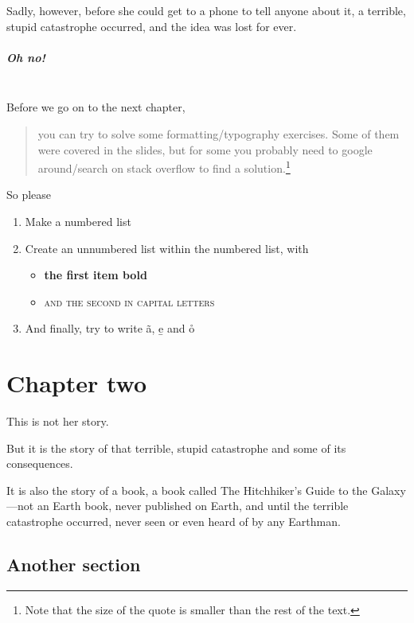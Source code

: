 \documentclass[a4paper, twocolumn, openany]{book}
\begin{document}
	Sadly, however, before she could get to a phone to tell anyone about it, a terrible, stupid catastrophe occurred, and the idea was lost for ever.
	
	\paragraph{Oh no!}~\\

\noindent Before we go on to the next chapter,
	
	\begin{quote}
		\small you can try to solve some formatting/typography exercises. Some of them were covered in the slides, but for some you probably need to google around/search on stack overflow to find a solution.\footnote{Note that the size of the quote is smaller than the rest of the text.}
	\end{quote}
	
\noindent So please
	
	\begin{enumerate}
		\item Make a numbered list
		\item Create an unnumbered list within the numbered list, with
		\begin{itemize}
			\item \textbf{the first item bold}
			\item \textsc{and the second in capital letters}
		\end{itemize}
		\item And finally, try to write \~{a}, \b{e} and \r{o}
	\end{enumerate}
	
	\chapter{Chapter two}
	
	\noindent This is not her story.
	
	But it is the story of that terrible, stupid catastrophe and some of its consequences.
	
	It is also the story of a book, a book called The Hitchhiker’s Guide to the Galaxy—not an Earth book, never published on Earth, and until the terrible catastrophe occurred, never seen or even heard of by any Earthman.
	
	\section{Another section}
	
\end{document}
